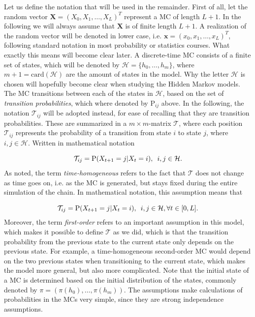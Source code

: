 \documentclass{article}
\begin{document}
Let us define the notation that will be used in the remainder. First of all, let the random vector $\mathbf{X} = (X_0, X_1, \ldots, X_L)^T$ represent a MC of length $L+1$. In the following we will always assume that $\mathbf{X}$ is of finite length $L+1$. A realization of the random vector will be denoted in lower case, i.e. $\mathbf{x} = (x_0, x_1, \ldots, x_L)^T$, following standard notation in most probability or statistics courses. What exactly this means will become clear later. A discrete-time MC consists of a finite set of states, which will be denoted by $\mathcal{H} = \{h_0, \ldots, h_m\}$, where $m+1 = \text{card}(\mathcal{H})$ are the amount of states in the model. Why the letter $\mathcal{H}$ is chosen will hopefully become clear when studying the Hidden Markov models. The MC transitions between each of the states in $\mathcal{H}$, based on the set of \textit{transition probabilities}, which where denoted by $\text{P}_{ij}$ above. In the following, the notation $\mathcal{T}_{ij}$ will be adopted instead, for ease of recalling that they are transition probabilities. These are summarized in a $m \times m$-matrix $\mathcal{T}$, where each position $\mathcal{T}_{ij}$ represents the probability of a transition from state $i$ to state $j$, where $i, j \in \mathcal{H}$. Written in mathematical notation

\begin{equation*}
        \mathcal{T}_{ij} = \text{P}(X_{t+1} = j|X_{t} = i), \hspace{0.5em} i,j \in \mathcal{H}. 
\end{equation*}
As noted, the term \textit{time-homogeneous} refers to the fact that $\mathcal{T}$ does not change as time goes on, i.e. as the MC is generated, but stays fixed during the entire simulation of the chain. In mathematical notation, this assumption means that

\begin{equation*}
    \mathcal{T}_{ij} = \text{P}(X_{t+1} = j|X_{t} = i), \hspace{0.5em} i,j \in \mathcal{H}, \forall t \in [0,L].
\end{equation*}
Moreover, the term \textit{first-order} refers to an important assumption in this model, which makes it possible to define $\mathcal{T}$ as we did, which is that the transition probability from the previous state to the current state only depends on the previous state. For example, a time-homogeneous second-order MC would depend on the two previous states when transitioning to the current state, which makes the model more general, but also more complicated. Note that the initial state of a MC is determined based on the initial distribution of the states, commonly denoted by $\pi = (\pi(h_0), \ldots, \pi(h_m))$. The assumptions make calculations of probabilities in the MCs very simple, since they are strong independence assumptions. 
\end{document}
